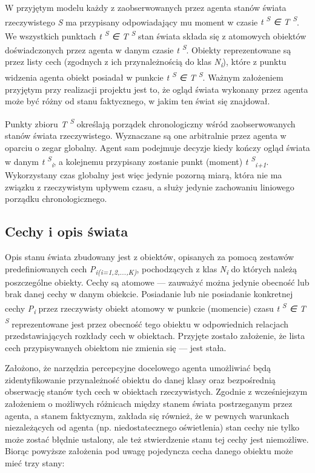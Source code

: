 	W przyjętym modelu każdy z zaobserwowanych przez agenta stanów świata rzeczywistego \textit{S} ma przypisany odpowiadający mu moment w czasie 
	\textit{t\textsuperscript{ S} ∈ T\textsuperscript{ S}}. 
	We wszystkich punktach 
	\textit{t\textsuperscript{ S} ∈ T\textsuperscript{ S}} 
	stan świata składa się z atomowych obiektów doświadczonych przez agenta w danym czasie 
	\textit{t\textsuperscript{ S}}.
	Obiekty reprezentowane są przez listy cech (zgodnych z ich przynależnością do klas 
	\textit{N\textsubscript{i}}), 
	które z punktu widzenia agenta obiekt posiadał w punkcie 
	\textit{t\textsuperscript{ S} ∈ T\textsuperscript{ S}}.
	Ważnym założeniem przyjętym przy realizacji projektu jest to, że ogląd świata wykonany przez agenta może być różny od stanu faktycznego, w jakim ten świat się znajdował.
	
	
	Punkty zbioru 
	\textit{T\textsuperscript{ S}} 
	określają porządek chronologiczny wśród zaobserwowanych stanów świata rzeczywistego. Wyznaczane są one arbitralnie przez agenta w oparciu o zegar globalny. Agent sam podejmuje decyzje kiedy kończy ogląd świata w danym 
	\textit{t\textsuperscript{ S}\textsubscript{i}}, 
	a kolejnemu przypisany zostanie punkt (moment)
	\textit{t\textsuperscript{ S}\textsubscript{i+1}}.
	Wykorzystany czas globalny jest więc jedynie pozorną miarą, która nie ma związku z rzeczywistym upływem czasu, a służy jedynie zachowaniu liniowego porządku chronologicznego.
	
	
	\subsection{Cechy i opis świata}
	
	Opis stanu świata zbudowany jest z obiektów, opisanych za pomocą zestawów predefiniowanych cech 
	\textit{P\textsubscript{i(i=1,2,...,K)}}, 
	pochodzących z klas 
	\textit{N\textsubscript{i}} 
	do których należą poszczególne obiekty. Cechy są atomowe --- zauważyć można jedynie obecność lub brak danej cechy w danym obiekcie. Posiadanie lub nie posiadanie konkretnej cechy
	\textit{P\textsubscript{i}}
	przez rzeczywisty obiekt atomowy w punkcie (momencie) czasu
	\textit{t\textsuperscript{ S} ∈ T\textsuperscript{ S}} 
	reprezentowane jest przez obecność tego obiektu w odpowiednich relacjach przedstawiających rozkłady cech w obiektach. Przyjęte zostało założenie, że lista cech przypisywanych obiektom nie zmienia się --- jest stała. 

	Założono, że narzędzia percepcyjne docelowego agenta umożliwiać będą zidentyfikowanie przynależność obiektu do danej klasy oraz bezpośrednią obserwację stanów tych cech w obiektach rzeczywistych. Zgodnie 
	z 
	wcześniejszym założeniem o możliwych różnicach między stanem świata postrzeganym przez agenta, a stanem faktycznym, zakłada się również, że w pewnych warunkach niezależących od agenta (np. niedostatecznego oświetlenia) stan cechy nie tylko może zostać błędnie ustalony, ale też stwierdzenie stanu tej cechy jest niemożliwe. Biorąc powyższe założenia pod uwagę pojedyncza cecha danego obiektu może mieć trzy stany: 
	
